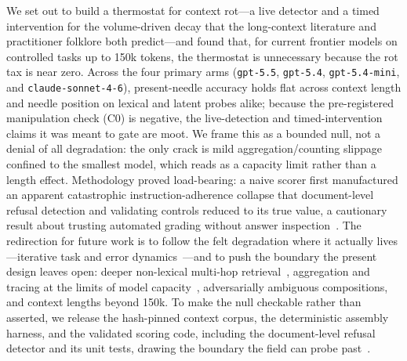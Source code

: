 \documentclass[11pt]{article}
\begin{document}
We set out to build a thermostat for context rot---a live detector and a timed
intervention for the volume-driven decay that the long-context literature and
practitioner folklore both predict---and found that, for current frontier models on
controlled tasks up to 150k tokens, the thermostat is unnecessary because the rot
tax is near zero. Across the four primary arms (\texttt{gpt-5.5}, \texttt{gpt-5.4},
\texttt{gpt-5.4-mini}, and \texttt{claude-sonnet-4-6}), present-needle accuracy holds
flat across context length and needle position on lexical and latent probes alike;
because the pre-registered manipulation check (C0) is negative, the live-detection
and timed-intervention claims it was meant to gate are moot. We frame this as a
bounded null, not a denial of all degradation: the only crack is mild
aggregation/counting slippage confined to the smallest model, which reads as a
capacity limit rather than a length effect. Methodology proved load-bearing: a naive
scorer first manufactured an apparent catastrophic instruction-adherence collapse
that document-level refusal detection and validating controls reduced to its true
value, a cautionary result about trusting automated grading without answer
inspection~\cite{zheng2023judge}. The redirection for future work is to follow the
felt degradation where it actually lives---iterative task and error
dynamics~\cite{orlanski2026slopcodebench, deng2026evoclaw}---and to push the
boundary the present design leaves open: deeper non-lexical multi-hop
retrieval~\cite{modarressi2025nolima}, aggregation and tracing at the limits of model
capacity~\cite{hsieh2024ruler}, adversarially ambiguous compositions, and context
lengths beyond 150k. To make the null checkable rather than asserted, we release the
hash-pinned context corpus, the deterministic assembly harness, and the validated
scoring code, including the document-level refusal detector and its unit tests, drawing
the boundary the field can probe past~\cite{adnan2025ddi}.



\end{document}
